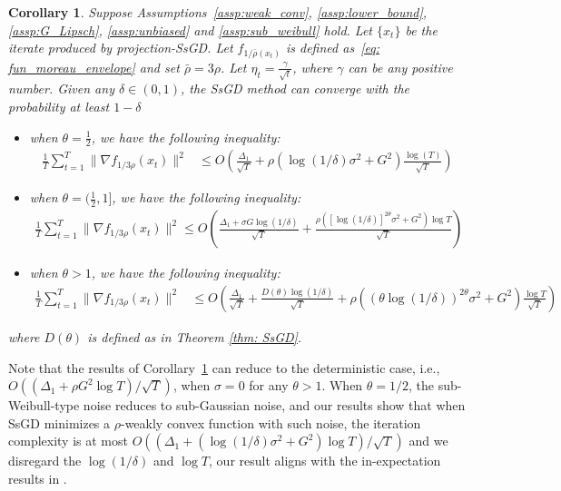 \documentclass{article}
\newtheorem{corollary}{Corollary}
\begin{document}
\begin{corollary}\label{coro: time_varying_step_SsGD_subweibull}
Suppose Assumptions~\ref{assp:weak_conv}, \ref{assp:lower_bound}, \ref{assp:G_Lipsch}, \ref{assp:unbiased} and \ref{assp:sub_weibull} hold. Let $\{x_t\}$ be the iterate produced by projection-SsGD. Let $f_{1/\bar{\rho}(x_t)}$ is defined as~\eqref{eq: fun_moreau_envelope} and set $\bar{\rho}=3\rho$. Let $\eta_t=\frac{\gamma}{\sqrt{t}}$, where $\gamma$ can be any positive number.  Given any $\delta\in(0,1)$, the SsGD method can converge with the probability at least $1-\delta$
        \begin{itemize}
            \item when $\theta=\frac{1}{2}$, we have the following inequality:
            \begin{align}
                \frac{1}{T}\sum_{t=1}^T \|\nabla f_{1/3\rho}(x_t)\|^2&\leq O\left(\frac{\Delta_1}{\sqrt{T}}+\rho(\log(1/\delta)\sigma^2+G^2)\frac{\log(T)}{\sqrt{T}}\right)
            \end{align}
            \item when $\theta = (\frac{1}{2},1]$, we have the following inequality:
            \begin{align}
                \frac{1}{T}\sum_{t=1}^T \|\nabla f_{1/3\rho}(x_t)\|^2\leq O\left(\frac{\Delta_1+\sigma G\log(1/\delta)}{\sqrt{T}}+\frac{\rho([\log(1/\delta)]^{2\theta}\sigma^2+G^2)\log T}{\sqrt{T}}\right)
            \end{align}   
            \item when $\theta > 1$, we have the following inequality:
            \begin{align}
                 \frac{1}{T}\sum_{t=1}^T \|\nabla f_{1/3\rho}(x_t)\|^2&\leq O\left(\frac{\Delta_1}{\sqrt{T}}+\frac{D(\theta)\log(1/\delta)}{\sqrt{T}}+\rho((\theta\log(1/\delta))^{2\theta}\sigma^2+G^2)\frac{\log T}{\sqrt{T}}\right)
            \end{align}
        \end{itemize}
        where $D(\theta)$ is defined as in Theorem \ref{thm: SsGD}.
\end{corollary}

Note that the results of Corollary~\ref{coro: time_varying_step_SsGD_subweibull} can reduce to the deterministic case, i.e., $O((\Delta_1+\rho G^2\log T)/\sqrt{T})$, when $\sigma = 0$ for any $\theta > 1$. When $\theta = 1/2$, the sub-Weibull-type noise reduces to sub-Gaussian noise, and our results show that when SsGD minimizes a $\rho$-weakly convex function with such noise, the iteration complexity is at most $O((\Delta_1 + (\log(1/\delta)\sigma^2 + G^2)\log T)/\sqrt{T})$ and we disregard the $\log(1/\delta)$ and $\log T$, our result aligns with the in-expectation results in \citep{Davis_2018}.
\end{document}
